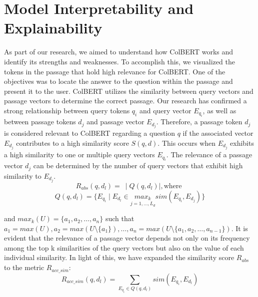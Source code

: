 \documentclass[11pt]{article}
\begin{document}
\section{Model Interpretability and Explainability}
As part of our research, we aimed to understand how ColBERT works and identify its strengths and weaknesses.
To accomplish this, we visualized the tokens in the passage that hold high relevance for ColBERT. One of the objectives
was to locate the answer to the question within the passage and present it to the user.
ColBERT utilizes the similarity between query vectors and passage vectors to determine the correct passage.
Our research has confirmed a strong relationship between query tokens $q_i$ and query vector $E_{q_i}$, as well as between
passage tokens $d_j$ and passage vector $E_{d_j}$.
Therefore, a passage token $d_j$ is considered relevant to ColBERT regarding
a question $q$ if the associated vector $E_{d_j}$ contributes to a high similarity score $S(q, d)$.
This occurs when $E_{d_j}$ exhibits a high similarity to one or multiple query vectors $E_{q_i}$.
The relevance of a passage vector $d_j$ can be determined by the number of query vectors that exhibit high similarity
to $E_{d_j}$.
$$
    R_{abs}(q, d_l) = \:\mid Q(q, d_l) \mid, \text{where }
$$
$$
  Q(q, d_l) = \{E_{q_i} \mid E_{d_l} \in \underset{j = 1, \dots, L_d}{max_k} sim(E_{q_i}, E_{d_j})\}
$$

and $max_k(U) = \{a_1, a_2, \dots, a_n\}$ such that $a_1 = max(U), a_2 = max(U \setminus \{a_1\}), \dots, a_n = max(U \setminus \{a_1, a_2, \dots, a_{n-1}\})$. It is evident that the relevance of a passage vector depends not only on its frequency among the top k similarities of the query vectors but also on the value of each individual similarity. In light of this, we have expanded the similarity score $R_{abs}$ to the metric $R_{acc\_sim}$:
$$
	R_{acc\_sim}(q, d_l) = \sum_{E_{q_i} \in Q(q, d_l)} sim(E_{q_i}, E_{d_l}) 
$$
\end{document}
